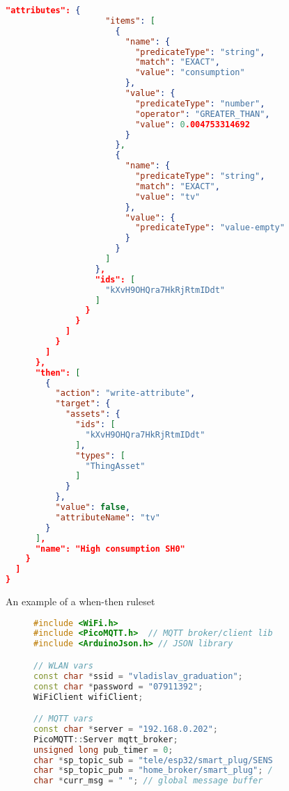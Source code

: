 \begin{appendices}
\begin{figure}[ht]\ContinuedFloat
    \centering
    \begin{lstlisting}[language=json,firstnumber=1]
                  "attributes": {
                    "items": [
                      {
                        "name": {
                          "predicateType": "string",
                          "match": "EXACT",
                          "value": "consumption"
                        },
                        "value": {
                          "predicateType": "number",
                          "operator": "GREATER_THAN",
                          "value": 0.004753314692
                        }
                      },
                      {
                        "name": {
                          "predicateType": "string",
                          "match": "EXACT",
                          "value": "tv"
                        },
                        "value": {
                          "predicateType": "value-empty"
                        }
                      }
                    ]
                  },
                  "ids": [
                    "kXvH9OHQra7HkRjRtmIDdt"
                  ]
                }
              }
            ]
          }
        ]
      },
      "then": [
        {
          "action": "write-attribute",
          "target": {
            "assets": {
              "ids": [
                "kXvH9OHQra7HkRjRtmIDdt"
              ],
              "types": [
                "ThingAsset"
              ]
            }
          },
          "value": false,
          "attributeName": "tv"
        }
      ],
      "name": "High consumption SH0"
    }
  ]
}
    \end{lstlisting}
    \caption{An example of a when-then ruleset}
    \label{fig:ruleset}
\end{figure}

\begin{figure}[ht]
    \centering
    \begin{subfigure}{\textwidth}
        \begin{lstlisting}[language=ino, firstnumber=1]
#include <WiFi.h>
#include <PicoMQTT.h>  // MQTT broker/client library
#include <ArduinoJson.h> // JSON library

// WLAN vars
const char *ssid = "vladislav_graduation";
const char *password = "07911392";
WiFiClient wifiClient;

// MQTT vars
const char *server = "192.168.0.202";
PicoMQTT::Server mqtt_broker;
unsigned long pub_timer = 0;
char *sp_topic_sub = "tele/esp32/smart_plug/SENSOR"; // topic for communication with smart plug
char *sp_topic_pub = "home_broker/smart_plug"; // topic for sending sp data to client(s)
char *curr_msg = " "; // global message buffer



\end{lstlisting}
\end{subfigure}
\end{figure}
\end{appendices}

